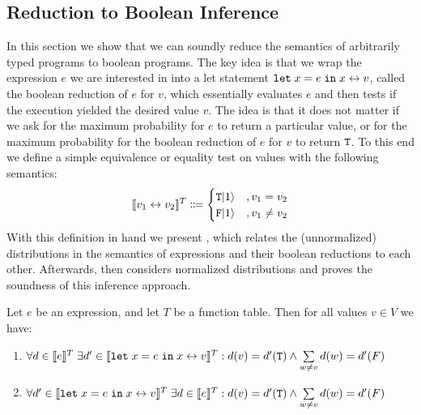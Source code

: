 \subsection{Reduction to Boolean Inference}\label{app:boolean_reduction}
In this section we show that we can soundly reduce the semantics of arbitrarily typed programs to boolean programs.
The key idea is that we wrap the expression $e$ we are interested in into a let statement $\texttt{let}\; x = e \;\texttt{in}\;  x \leftrightarrow v$, called the boolean reduction of $e$ for $v$, which essentially evaluates $e$ and then tests if the execution yielded the desired value $v$.
The idea is that it does not matter if we ask for the maximum probability for $e$ to return a particular value, or for the maximum probability for the boolean reduction of $e$ for $v$ to return $\texttt{T}$.
To this end we define a simple equivalence or equality test on values with the following semantics:
$$ \llbracket v_1 \leftrightarrow v_2 \rrbracket^T \Coloneqq \begin{cases}
	\texttt{T}| 1\rangle &, v_1 = v_2 \\
	\texttt{F}| 1\rangle &, v_1 \neq v_2 \\
\end{cases}$$
With this definition in hand we present , which relates the (unnormalized) distributions in the semantics of expressions and their boolean reductions to each other.
Afterwards,  then considers normalized distributions and proves the soundness of this inference approach.
\begin{lemma}\label{theo:boolean_reduction}
	Let $e$ be an \NDICE expression, and let $T$ be a function table.
	Then for all values $v \in V$ we have:
	\begin{enumerate}
		\item $\forall d \in \llbracket e \rrbracket^T \; \exists d' \in \llbracket \texttt{let}\; x = e \;\texttt{in}\;  x \leftrightarrow v\rrbracket^T: d(v) = d'(\texttt{T}) \land \sum\limits_{w \neq v} d(w) = d'(F)$
		\item $\forall d' \in \llbracket \texttt{let}\; x = e \;\texttt{in}\;  x \leftrightarrow v \rrbracket^T \; \exists d \in \llbracket e \rrbracket^T: d(v) = d'(\texttt{T}) \land \sum\limits_{w \neq v} d(w) = d'(F)$
	\end{enumerate}
\end{lemma}
